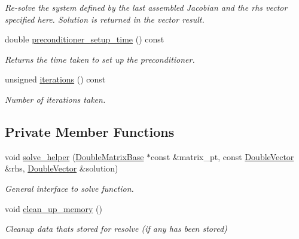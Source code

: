 \begin{DoxyCompactItemize}
\begin{DoxyCompactList}\small\item\em Re-\/solve the system defined by the last assembled Jacobian and the rhs vector specified here. Solution is returned in the vector result. \end{DoxyCompactList}\item 
double \hyperlink{classoomph_1_1GS_a5ee0e379319f6919f7ac00a715be72fb}{preconditioner\+\_\+setup\+\_\+time} () const
\begin{DoxyCompactList}\small\item\em Returns the time taken to set up the preconditioner. \end{DoxyCompactList}\item 
unsigned \hyperlink{classoomph_1_1GS_ad182a2d91cb9d629cb516102f9a3c649}{iterations} () const
\begin{DoxyCompactList}\small\item\em Number of iterations taken. \end{DoxyCompactList}\end{DoxyCompactItemize}
\subsection*{Private Member Functions}
\begin{DoxyCompactItemize}
\item 
void \hyperlink{classoomph_1_1GS_a727ae9502ba5cd458358b5c50a57437e}{solve\+\_\+helper} (\hyperlink{classoomph_1_1DoubleMatrixBase}{Double\+Matrix\+Base} $\ast$const \&matrix\+\_\+pt, const \hyperlink{classoomph_1_1DoubleVector}{Double\+Vector} \&rhs, \hyperlink{classoomph_1_1DoubleVector}{Double\+Vector} \&solution)
\begin{DoxyCompactList}\small\item\em General interface to solve function. \end{DoxyCompactList}\item 
void \hyperlink{classoomph_1_1GS_a7dcf28fef43088ead0e662a32275b383}{clean\+\_\+up\+\_\+memory} ()
\begin{DoxyCompactList}\small\item\em Cleanup data that\textquotesingle{}s stored for resolve (if any has been stored) \end{DoxyCompactList}\end{DoxyCompactItemize}
